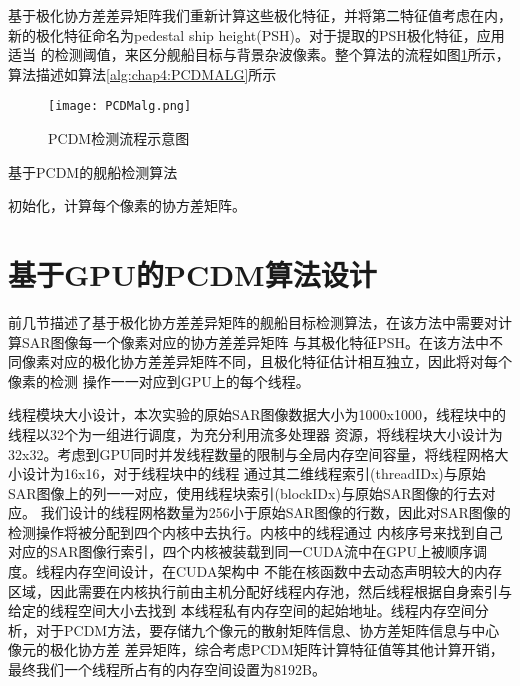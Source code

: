       基于极化协方差差异矩阵我们重新计算这些极化特征，并将第二特征值考虑在内，新的极化特征命名为pedestal ship height(PSH)。对于提取的PSH极化特征，应用适当
      的检测阈值，来区分舰船目标与背景杂波像素。整个算法的流程如图\ref{fig:chap4:PCDMalg}所示，算法描述如算法\ref{alg:chap4:PCDMALG}所示

    \begin{figure}[H] %
      \centering
      \texttt{[image: PCDMalg.png]}
      \caption{PCDM检测流程示意图}
      \label{fig:chap4:PCDMalg}
    \end{figure}

    \begin{algorithm}[t]
      \caption{基于PCDM的舰船检测算法}
      \label{alg:chap4:PCDMALG}
      \BlankLine
      初始化，计算每个像素的协方差矩阵。

    \end{algorithm}

\section{基于GPU的PCDM算法设计}
      
      前几节描述了基于极化协方差差异矩阵的舰船目标检测算法，在该方法中需要对计算SAR图像每一个像素对应的协方差差异矩阵
      与其极化特征PSH。在该方法中不同像素对应的极化协方差差异矩阵不同，且极化特征估计相互独立，因此将对每个像素的检测
      操作一一对应到GPU上的每个线程。

      线程模块大小设计，本次实验的原始SAR图像数据大小为1000x1000，线程块中的线程以32个为一组进行调度，为充分利用流多处理器
      资源，将线程块大小设计为32x32。考虑到GPU同时并发线程数量的限制与全局内存空间容量，将线程网格大小设计为16x16，对于线程块中的线程
      通过其二维线程索引(threadIDx)与原始SAR图像上的列一一对应，使用线程块索引(blockIDx)与原始SAR图像的行去对应。
      我们设计的线程网格数量为256小于原始SAR图像的行数，因此对SAR图像的检测操作将被分配到四个内核中去执行。内核中的线程通过
      内核序号来找到自己对应的SAR图像行索引，四个内核被装载到同一CUDA流中在GPU上被顺序调度。线程内存空间设计，在CUDA架构中
      不能在核函数中去动态声明较大的内存区域，因此需要在内核执行前由主机分配好线程内存池，然后线程根据自身索引与给定的线程空间大小去找到
      本线程私有内存空间的起始地址。线程内存空间分析，对于PCDM方法，要存储九个像元的散射矩阵信息、协方差矩阵信息与中心像元的极化协方差
      差异矩阵，综合考虑PCDM矩阵计算特征值等其他计算开销，最终我们一个线程所占有的内存空间设置为8192B。

